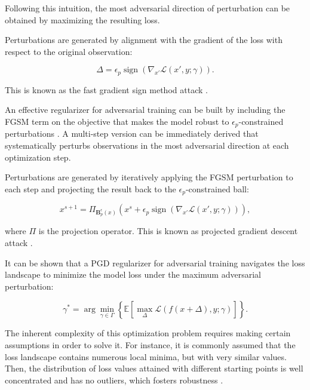 Following this intuition, the most adversarial direction of 
perturbation can be obtained by maximizing the resulting loss.

\begin{attack}
    Perturbations are generated by alignment with the gradient of the 
    loss with respect to the original observation:
    
    $$
    \Delta = \epsilon_p \operatorname{sign}(\nabla_{x'} \mathcal{L}(x', y; \gamma)).
    $$

    This is known as the fast gradient sign method attack
    \cite{goodfellowExplainingHarnessingAdversarial2015}.
\end{attack}

An effective regularizer for adversarial training can be built by 
including the FGSM term on the objective that makes the model robust 
to $\epsilon_p$-constrained perturbations \cite{goodfellowExplainingHarnessingAdversarial2015}. 
A multi-step version can be immediately derived that systematically
perturbs observations in the most adversarial direction at each
optimization step.

\begin{attack}
    Perturbations are generated by iteratively applying the FGSM
    perturbation to each step and projecting the result back to the
    $\epsilon_p$-constrained ball:

    $$
        x^{s+1} = \Pi_{\mathbf{B}_p^\epsilon(x)} \left ( x^s + \epsilon_p \operatorname{sign}(\nabla_{x'} \mathcal{L}(x', y; \gamma)) \right ),
    $$

    where $\Pi$ is the projection operator. This is known as
    projected gradient descent attack
    \cite{madryDeepLearningModels2019}.
    \label{attack:pgd}
\end{attack}

It can be shown that a PGD regularizer for adversarial training navigates
the loss landscape to minimize the model loss under
the maximum adversarial perturbation:

$$
    \gamma^* = \arg \min_{\gamma \in \Gamma} \left \{ \mathbb{E} \left[ \max_{\Delta} \mathcal{L} (f(x + \Delta), y; \gamma) \right]  \right \}.
$$

The inherent complexity of this optimization problem requires making
certain assumptions in order to solve it. For instance, it is commonly
assumed that the loss landscape contains numerous local minima, but
with very similar values. Then, the distribution of loss values attained
with different starting points is well concentrated and has no outliers,
which fosters robustness
\cite{madryDeepLearningModels2019}.\\

